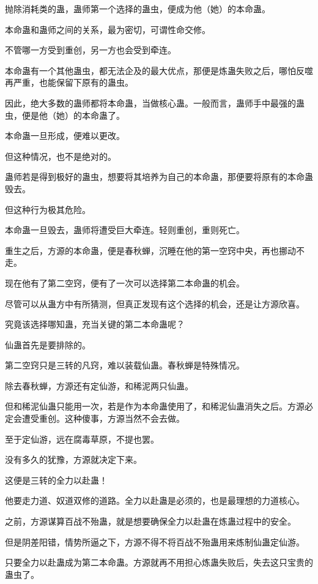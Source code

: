
\begin{this_body}

抛除消耗类的蛊，蛊师第一个选择的蛊虫，便成为他（她）的本命蛊。

本命蛊和蛊师之间的关系，最为密切，可谓性命交修。

不管哪一方受到重创，另一方也会受到牵连。

本命蛊有一个其他蛊虫，都无法企及的最大优点，那便是炼蛊失败之后，哪怕反噬再严重，也能保留下原有的蛊虫。

因此，绝大多数的蛊师都将本命蛊，当做核心蛊。一般而言，蛊师手中最强的蛊虫，便是他（她）的本命蛊了。

本命蛊一旦形成，便难以更改。

但这种情况，也不是绝对的。

蛊师若是得到极好的蛊虫，想要将其培养为自己的本命蛊，那便要将原有的本命蛊毁去。

但这种行为极其危险。

本命蛊一旦毁去，蛊师将遭受巨大牵连。轻则重创，重则死亡。

重生之后，方源的本命蛊，便是春秋蝉，沉睡在他的第一空窍中央，再也挪动不走。

现在他有了第二空窍，便有了一次可以选择第二本命蛊的机会。

尽管可以从蛊方中有所猜测，但真正发现有这个选择的机会，还是让方源欣喜。

究竟该选择哪知蛊，充当关键的第二本命蛊呢？

仙蛊首先是要排除的。

第二空窍只是三转的凡窍，难以装载仙蛊。春秋蝉是特殊情况。

除去春秋蝉，方源还有定仙游，和稀泥两只仙蛊。

但和稀泥仙蛊只能用一次，若是作为本命蛊使用了，和稀泥仙蛊消失之后。方源必定会遭受重创。这种傻事，方源当然不会去做。

至于定仙游，远在腐毒草原，不提也罢。

没有多久的犹豫，方源就决定下来。

这便是三转的全力以赴蛊！

他要走力道、奴道双修的道路。全力以赴蛊是必须的，也是最理想的力道核心。

之前，方源谋算百战不殆蛊，就是想要确保全力以赴蛊在炼蛊过程中的安全。

但是阴差阳错，情势所逼之下，方源不得不将百战不殆蛊用来炼制仙蛊定仙游。

只要全力以赴蛊成为第二本命蛊。方源就再不用担心炼蛊失败后，失去这只宝贵的蛊虫了。


\end{this_body}
